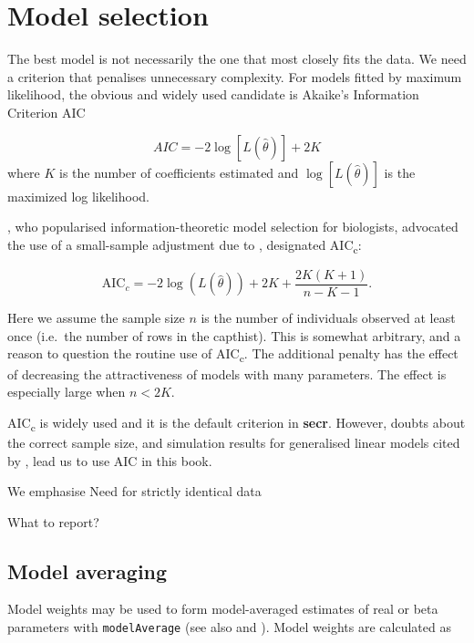 \documentclass[
]{book}
\begin{document}
\section{Model selection}\label{model-selection}

The best model is not necessarily the one that most closely fits the data. We need a criterion that penalises unnecessary complexity. For models fitted by maximum likelihood, the obvious and widely used candidate is Akaike's Information Criterion AIC

\begin{equation}
AIC = -2\log[L(\hat \theta)] +2K
\end{equation}
where \(K\) is the number of coefficients estimated and \(\log[L(\hat \theta)]\) is the maximized log likelihood.

\citet{Burnham2002}, who popularised information-theoretic model selection for biologists, advocated the use of a small-sample adjustment due to \citet{Hurvich1989}, designated AIC\textsubscript{c}:

\begin{equation}
\mbox{AIC}_c = -2\log(L(\hat{\theta})) + 2K + \frac{2K(K+1)}{n-K-1}.
\end{equation}

Here we assume the sample size \(n\) is the number of individuals observed at least once (i.e.~the number of rows in the capthist). This is somewhat arbitrary, and a reason to question the routine use of AIC\textsubscript{c}. The additional penalty has the effect of decreasing the attractiveness of models with many parameters. The effect is especially large when \(n<2K\).

AIC\textsubscript{c} is widely used and it is the default criterion in \textbf{secr}. However, doubts about the correct sample size, and simulation results for generalised linear models cited by \citet[p.~60]{Fletcher2019}, lead us to use AIC in this book.

We emphasise
Need for strictly identical data

What to report?

\subsection{Model averaging}\label{model-averaging}

Model weights may be used to form model-averaged estimates of real or beta parameters with \texttt{modelAverage} (see also \citet{Buckland1997} and \citet{Burnham2002}). Model weights are calculated as
\end{document}
